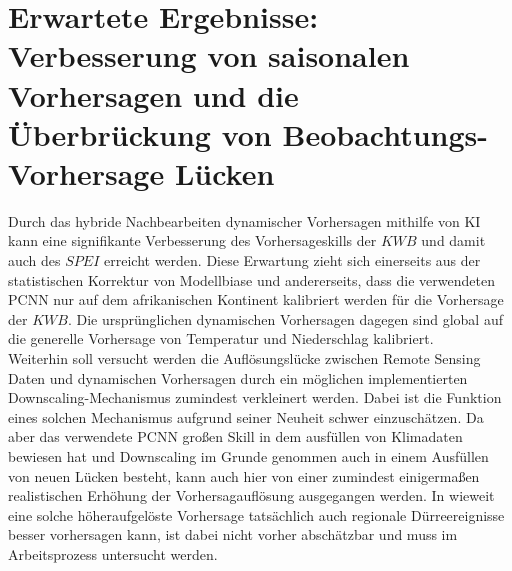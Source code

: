 \documentclass[ba-lentz.tex]{subfile}
\begin{document}
{\let\clearpage\relax \chapter{Erwartete Ergebnisse: Verbesserung von saisonalen Vorhersagen und die Überbrückung von Beobachtungs-Vorhersage Lücken}}\label{results}

Durch das hybride Nachbearbeiten dynamischer Vorhersagen mithilfe von KI kann eine signifikante Verbesserung des Vorhersageskills der $KWB$ und damit auch des $SPEI$ erreicht werden.
Diese Erwartung zieht sich einerseits aus der statistischen Korrektur von Modellbiase und andererseits, dass die verwendeten PCNN nur auf dem afrikanischen Kontinent kalibriert werden für die Vorhersage der $KWB$.
Die ursprünglichen dynamischen Vorhersagen dagegen sind global auf die generelle Vorhersage von Temperatur und Niederschlag kalibriert. \\
Weiterhin soll versucht werden die Auflösungslücke zwischen Remote Sensing Daten und dynamischen Vorhersagen durch ein möglichen implementierten Downscaling-Mechanismus zumindest verkleinert werden.
Dabei ist die Funktion eines solchen Mechanismus aufgrund seiner Neuheit schwer einzuschätzen.
Da aber das verwendete PCNN großen Skill in dem ausfüllen von Klimadaten bewiesen hat \parencite{lentz_improving_2025} und Downscaling im Grunde genommen auch in einem Ausfüllen von neuen Lücken besteht, kann auch hier von einer zumindest einigermaßen realistischen Erhöhung der Vorhersagauflösung ausgegangen werden.
In wieweit eine solche höheraufgelöste Vorhersage tatsächlich auch regionale Dürreereignisse besser vorhersagen kann, ist dabei nicht vorher abschätzbar und muss im Arbeitsprozess untersucht werden.
\end{document}
